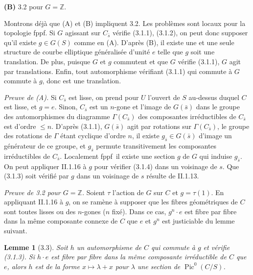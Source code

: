 \documentclass[11pt,a4paper]{amsart}
\theoremstyle{plain}
\newtheorem{lemma}[theorem]{Lemme}
\theoremstyle{definition}
\DeclareMathOperator{\Pic}{Pic}
\newcommand{\ZZ}{\mathbb{Z}}
\newcommand{\fppf}{\textup{fppf}}
\begin{document}
\medskip

\noindent\textbf{(B)} 3.2 pour $G = \ZZ$.

\medskip

Montrons d\'ej\`a que (A) et (B) impliquent 3.2. Les probl\`emes sont locaux pour la topologie \fppf. Si $G$ agissant sur $C_{\bar{s}}$ v\'erifie (3.1.1), (3.1.2), on peut donc supposer qu'il existe $g \in G(S)$ comme en (A). D'apr\`es (B), il existe une et une seule structure de courbe elliptique g\'en\'eralis\'ee d'unit\'e $e$ telle que $g$ soit une translation. De plus, puisque $G$ et $g$ commutent et que $G$ v\'erifie (3.1.1), $G$ agit par translations. Enfin, tout automorphisme v\'erifiant (3.1.1) qui commute \`a $G$ commute \`a $g$, donc est une translation.

\medskip

\noindent\textit{Preuve de (A).} Si $C_{\bar{s}}$ est lisse, on prend pour $U$ l'ouvert de $S$ au-dessus duquel $C$ est lisse, et $g = e$. Sinon, $C_{\bar{s}}$ est un $n$-gone et l'image de $G(\bar{s})$ dans le groupe des automorphismes du diagramme $\Gamma(C_{\bar{s}})$ des composantes irr\'eductibles de $C_{\bar{s}}$ est d'ordre $\leq n$. D'apr\`es (3.1.1), $G(\bar{s})$ agit par rotations sur $\Gamma(C_{\bar{s}})$, le groupe des rotations de $\Gamma$ \'etant cyclique d'ordre $n$, il existe $g_{\bar{s}} \in G(\bar{s})$ d'image un g\'en\'erateur de ce groupe, et $g_{\bar{s}}$ permute transitivement les composantes irr\'eductibles de $C_{\bar{s}}$. Localement \fppf\ il existe une section $g$ de $G$ qui induise $g_{\bar{s}}$. On peut appliquer II.1.16 \`a $g$ pour v\'erifier (3.1.4) dans un voisinage de $s$. Que (3.1.3) soit v\'erifi\'e par $g$ dans un voisinage de $s$ r\'esulte de II.1.13.

\medskip

\noindent\textit{Preuve de 3.2 pour $G = \ZZ$.} Soient $\tau$ l'action de $G$ sur $C$ et $g = \tau(1)$. En appliquant II.1.16 \`a $g$, on se ram\`ene \`a supposer que les fibres g\'eom\'etriques de $C$ sont toutes lisses ou des $n$-gones ($n$ fix\'e). Dans ce cas, $g^n \cdot e$ est fibre par fibre dans la m\^eme composante connexe de $C$ que $e$ et $g^n$ est justiciable du lemme suivant.

\begin{lemma}[3.3]
Soit $h$ un automorphisme de $C$ qui commute \`a $g$ et v\'erifie (3.1.3). Si $h \cdot e$ est fibre par fibre dans la m\^eme composante irr\'eductible de $C$ que $e$, alors $h$ est de la forme $x \mapsto \lambda + x$ pour $\lambda$ une section de $\Pic^0(C/S)$.
\end{lemma}
\end{document}
